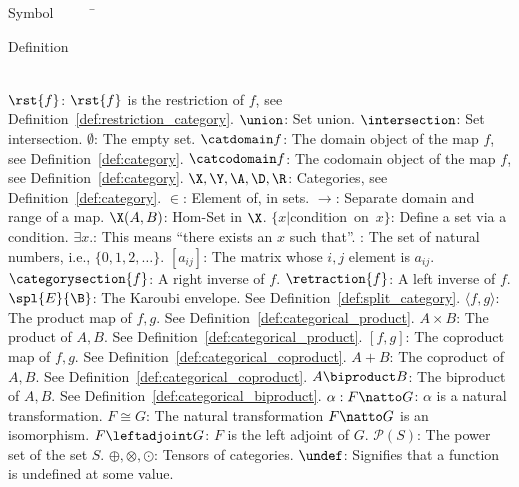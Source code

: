 


\begin{tabbing}
Symbol~~~~~\= \ \ \ \ \ \ \ \ \ \ \ \ \ \ \ \ \ \ \ \ \ \ \ \ \ \ \ \ \ \ \ \ \ \ \ \  \parbox{5in}{Definition}\\

\addsymbol \mbox{$\rst{f}$}: {$\rst{f}$ is the restriction of $f$, see Definition~\ref{def:restriction_category}.}
\addsymbol \mbox{$\union$}: {Set union.}
\addsymbol \mbox{$\intersection$}: {Set intersection.}
\addsymbol \mbox{$\emptyset$}: {The empty set.}
\addsymbol \mbox{$\catdomain f$}: {The domain object of the map $f$, see Definition~\ref{def:category}.}
\addsymbol \mbox{$\catcodomain f$}: {The codomain object of the map $f$, see Definition~\ref{def:category}.}
\addsymbol \mbox{$\X,\Y, \A,\D,\R$}: {Categories, see Definition~\ref{def:category}.}
\addsymbol \mbox{$\in$}: {Element of, in sets.}
\addsymbol \mbox{$\to$}: {Separate domain and range of a map.}
\addsymbol \mbox{$\X(A,B)$}: {Hom-Set in $\X$.}
\addsymbol \mbox{$\{x | $condition on $x\}$}: {Define a set via a condition.}
\addsymbol \mbox{$\exists x.$}: {This means ``there exists an $x$ such that''.}
\addsymbol \mbox{\nat}: {The set of natural numbers, i.e., $\{0,1,2,\ldots\}$.}
\addsymbol \mbox{$[a_{i j}]$}: {The matrix whose $i,j$ element is $a_{i j}$.}
\addsymbol \mbox{$\categorysection{f}$}: {A right inverse of $f$.}
\addsymbol \mbox{$\retraction{f}$}: {A left inverse of $f$.}
\addsymbol \mbox{$\spl{E}{\B}$}: {The Karoubi envelope. See  Definition~\ref{def:split_category}.}
\addsymbol \mbox{$\langle f,g\rangle$}: {The product map of $f,g$. See Definition~\ref{def:categorical_product}.}
\addsymbol \mbox{$A\times B$}: {The product of $A,B$. See Definition~\ref{def:categorical_product}.}
\addsymbol \mbox{$[f,g]$}: {The coproduct map of $f,g$. See Definition~\ref{def:categorical_coproduct}.}
\addsymbol \mbox{$A+B$}: {The coproduct of $A,B$. See Definition~\ref{def:categorical_coproduct}.}
\addsymbol \mbox{$A\biproduct B$}: {The biproduct of $A,B$. See Definition~\ref{def:categorical_biproduct}.}
\addsymbol \mbox{$\alpha: F\natto G$}: {$\alpha$ is a natural transformation.}
\addsymbol \mbox{$F\cong G$}: {The natural transformation $F\natto G$ is an isomorphism.}
\addsymbol \mbox{$F\leftadjoint G$}: {$F$ is the left adjoint of $G$.}
\addsymbol \mbox{$\mathcal{P}(S)$}: {The power set of the set $S$.}
\addsymbol \mbox{$\oplus,\otimes,\odot$}: {Tensors of categories.}
\addsymbol \mbox{$\undef$}: {Signifies that a function is undefined at some value.}

\end{tabbing}
